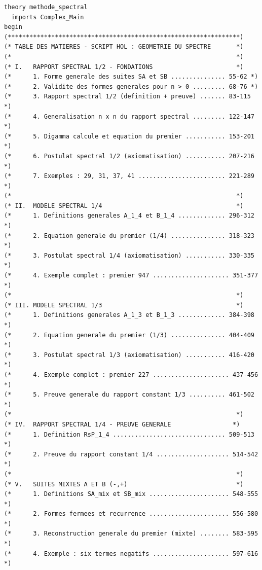 \documentclass[a4paper,11pt]{article}
\begin{document}
\begin{holcode}[title={\textcolor{white}{File: methode\_spectral.thy -- Part 1/4}}]
\begin{lstlisting}
theory methode_spectral
  imports Complex_Main
begin
(****************************************************************)
(* TABLE DES MATIERES - SCRIPT HOL : GEOMETRIE DU SPECTRE       *)
(*                                                              *)
(* I.   RAPPORT SPECTRAL 1/2 - FONDATIONS                       *)
(*      1. Forme generale des suites SA et SB ............... 55-62 *)
(*      2. Validite des formes generales pour n > 0 ......... 68-76 *)
(*      3. Rapport spectral 1/2 (definition + preuve) ....... 83-115 *)
(*      4. Generalisation n x n du rapport spectral ......... 122-147 *)
(*      5. Digamma calcule et equation du premier ........... 153-201 *)
(*      6. Postulat spectral 1/2 (axiomatisation) ........... 207-216 *)
(*      7. Exemples : 29, 31, 37, 41 ........................ 221-289 *)
(*                                                              *)
(* II.  MODELE SPECTRAL 1/4                                     *)
(*      1. Definitions generales A_1_4 et B_1_4 ............. 296-312 *)
(*      2. Equation generale du premier (1/4) ............... 318-323 *)
(*      3. Postulat spectral 1/4 (axiomatisation) ........... 330-335 *)
(*      4. Exemple complet : premier 947 ..................... 351-377 *)
(*                                                              *)
(* III. MODELE SPECTRAL 1/3                                     *)
(*      1. Definitions generales A_1_3 et B_1_3 ............. 384-398 *)
(*      2. Equation generale du premier (1/3) ............... 404-409 *)
(*      3. Postulat spectral 1/3 (axiomatisation) ........... 416-420 *)
(*      4. Exemple complet : premier 227 ..................... 437-456 *)
(*      5. Preuve generale du rapport constant 1/3 .......... 461-502 *)
(*                                                              *)
(* IV.  RAPPORT SPECTRAL 1/4 - PREUVE GENERALE                 *)
(*      1. Definition RsP_1_4 ............................... 509-513 *)
(*      2. Preuve du rapport constant 1/4 .................... 514-542 *)
(*                                                              *)
(* V.   SUITES MIXTES A ET B (-,+)                              *)
(*      1. Definitions SA_mix et SB_mix ...................... 548-555 *)
(*      2. Formes fermees et recurrence ...................... 556-580 *)
(*      3. Reconstruction generale du premier (mixte) ........ 583-595 *)
(*      4. Exemple : six termes negatifs ..................... 597-616 *)

\end{lstlisting}
\end{holcode}
\end{document}
